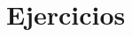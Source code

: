 \section*{Ejercicios}

\begin{comment}

\begin{enumerate}[1.] 

    \item Hallar, mediante reducción por filas de la matriz de coeficientes todas las soluciones del siguiente sistema de ecuaciones:
    $$\begin{array}{rrrrrcc}
	\frac{1}{3}x_1&+&2x_2&-&6x_3&=&0\\
		      -4x_1&&&+&5x_3&=&0\\
			   -3x_1&+&6x_2&-&13x_3&=&0\\
			   -\frac{7}{3}x_1&+&2x_2&-&\frac{8}{3}x_3&=&0\\
   \end{array}.$$\\\\
	Respuesta.-\; Consideremos la matriz de la forma $AX=0$ para la respectiva reducción por filas de la siguiente manera:

	$$\begin{array}{ccccc}


\end{comment}
